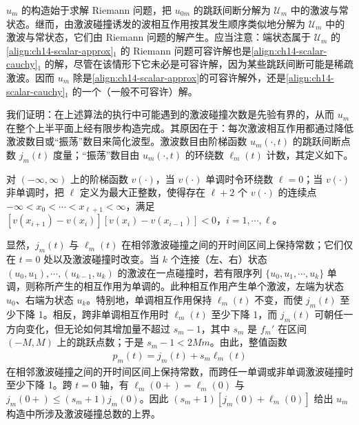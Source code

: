 \documentclass[../../main.tex]{subfiles}
\begin{document}
$u_m$ 的构造始于求解 Riemann 问题，把 $u_{0m}$ 的跳跃间断分解为 $\mathscr{U}_m$ 中的激波与常状态。继而，由激波碰撞诱发的波相互作用按其发生顺序类似地分解为 $\mathscr{U}_m$ 中的激波与常状态，它们由 Riemann 问题的解产生。应当注意：端状态属于 $\mathscr{U}_m$ 的\eqref{align:ch14-scalar-approx}$_1$ 的 Riemann 问题可容许解也是\eqref{align:ch14-scalar-cauchy}$_1$ 的解，尽管在该情形下它未必是可容许解，因为某些跳跃间断可能是稀疏激波。因而 $u_m$ 除是\eqref{align:ch14-scalar-approx}的可容许解外，还是\eqref{align:ch14-scalar-cauchy}$_1$ 的一个（一般不可容许）解。

我们证明：在上述算法的执行中可能遇到的激波碰撞次数是先验有界的，从而 $u_m$ 在整个上半平面上经有限步构造完成。其原因在于：每次激波相互作用都通过降低激波数目或``振荡''数目来简化波型。激波数目由阶梯函数 $u_m(\cdot,t)$ 的跳跃间断点数 $j_m(t)$ 度量；``振荡''数目由 $u_m(\cdot,t)$ 的环绕数 $\ell_m(t)$ 计数，其定义如下。

对 $(-\infty,\infty)$ 上的阶梯函数 $v(\cdot)$，当 $v(\cdot)$ 单调时令环绕数 $\ell=0$；当 $v(\cdot)$ 非单调时，把 $\ell$ 定义为最大正整数，使得存在 $\ell+2$ 个 $v(\cdot)$ 的连续点 $-\infty<x_0<\cdots<x_{\ell+1}<\infty$，满足 $[v(x_{i+1})-v(x_i)][v(x_i)-v(x_{i-1})]<0$，$i=1,\cdots,\ell$。

显然，$j_m(t)$ 与 $\ell_m(t)$ 在相邻激波碰撞之间的开时间区间上保持常数；它们仅在 $t=0$ 处以及激波碰撞时改变。当 $k$ 个连接（左、右）状态 $(u_0,u_1),\cdots,(u_{k-1},u_k)$ 的激波在一点碰撞时，若有限序列 $\{u_0,u_1,\cdots,u_k\}$ 单调，则称所产生的相互作用为单调的。此种相互作用产生单个激波，左端为状态 $u_0$、右端为状态 $u_k$。特别地，单调相互作用保持 $\ell_m(t)$ 不变，而使 $j_m(t)$ 至少下降 1。相反，跨非单调相互作用时 $\ell_m(t)$ 至少下降 1，而 $j_m(t)$ 可朝任一方向变化，但无论如何其增加量不超过 $s_m-1$，其中 $s_m$ 是 $f_m'$ 在区间 $(-M,M)$ 上的跳跃点数；于是 $s_m-1<2Mm$。由此，整值函数
\begin{align*}
p_m(t)=j_m(t)+s_m\ell_m(t)
\end{align*}
在相邻激波碰撞之间的开时间区间上保持常数，而跨任一单调或非单调激波碰撞时至少下降 1。跨 $t=0$ 轴，有 $\ell_m(0+)=\ell_m(0)$ 与 $j_m(0+)\leqslant(s_m+1)j_m(0)$。因此 $(s_m+1)[j_m(0)+\ell_m(0)]$ 给出 $u_m$ 构造中所涉及激波碰撞总数的上界。
\end{document}
